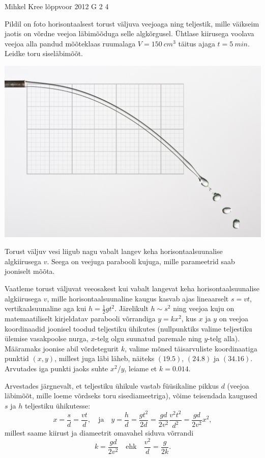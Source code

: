 {Mihkel Kree} %
{lõppvoor} %
{2012} %
{G 2} %
{4} %
{
\ifStatement
Pildil on foto horisontaalsest torust väljuva veejoaga ning teljestik, mille
väikseim jaotis on võrdne veejoa läbimõõduga selle algkõrgusel. Ühtlase
kiirusega voolava veejoa alla pandud mõõteklaas ruumalaga
$V=\SI{150}{cm^3}$ täitus ajaga $t=\SI{5}{min}$. Leidke
toru siseläbimõõt.
\begin{center}
\includegraphics[width=0.7\linewidth]{2012-v3g-02-jet}%
\end{center}
\fi


\ifHint
Torust väljuv vesi liigub nagu vabalt langev keha horisontaalsuunalise algkiirusega $v$. Seega on veejuga parabooli kujuga, mille parameetrid saab jooniselt mõõta.
\fi


\ifSolution
Vaatleme torust väljuvat veeosakest kui vabalt langevat keha horisontaalsuunalise algkiirusega $v$, mille horisontaalsuunaline kaugus kasvab ajas lineaarselt $s=vt$, vertikaalsuunaline aga kui $h=\frac{1}{2}gt^2$. Järelikult $h\sim s^2$ ning veejoa kuju on matemaatiliselt kirjeldatav parabooli võrrandiga $y=kx^2$, kus $x$ ja $y$ on veejoa koordinaadid joonisel toodud teljestiku ühikutes (nullpunktiks valime teljestiku ülemise vasakpoolse nurga, $x$-telg olgu suunatud paremale ning $y$-telg alla). Määramaks joonise abil võrdetegurit $k$, valime mõned täisarvuliste koordinaatiga punktid $(x,y)$, millest juga läbi läheb, näiteks $(\num{19,5})$, $(\num{24,8})$ ja $(\num{34,16})$. Arvutades iga punkti jaoks suhte $x^2/y$, leiame et $k=\num{0.014}$. 
	
Arvestades järgnevalt, et teljestiku ühikule vastab füüsikaline pikkus $d$ (veejoa läbimõõt, mille loeme võrdseks toru sisediameetriga), võime teisendada kaugused $s$ ja $h$ teljestiku ühikutesse:
\[x=\frac{s}{d}=\frac{vt}{d},\quad \mathrm{ja} \quad y=\frac{h}{d}=\frac{gt^2}{2d}=\frac{gd}{2v^2}\frac{v^2t^2}{d^2}=\frac{gd}{2v^2}x^2,\]
millest saame kiirust ja diameetrit omavahel siduva võrrandi
\begin{equation}\label{eq:2012-v3g-02-vd1}
k=\frac{gd}{2v^2}\quad \mathrm{ehk} \quad \frac{v^2}{d}=\frac{g}{2k}.
\end{equation}
	
}
